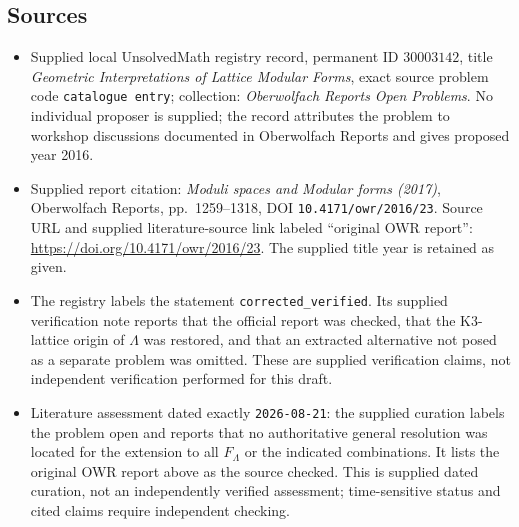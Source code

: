 \documentclass[11pt]{article}
\begin{document}
\subsection{Sources}
\begin{itemize}
\item Supplied local UnsolvedMath registry record, permanent ID \(30003142\), title \emph{Geometric Interpretations of Lattice Modular Forms}, exact source problem code \texttt{catalogue entry}; collection: \emph{Oberwolfach Reports Open Problems}. No individual proposer is supplied; the record attributes the problem to workshop discussions documented in Oberwolfach Reports and gives proposed year 2016.
\item Supplied report citation: \emph{Moduli spaces and Modular forms (2017)}, Oberwolfach Reports, pp.\ 1259--1318, DOI \texttt{10.4171/owr/2016/23}. Source URL and supplied literature-source link labeled ``original OWR report'': \url{https://doi.org/10.4171/owr/2016/23}. The supplied title year is retained as given.
\item The registry labels the statement \texttt{corrected\_verified}. Its supplied verification note reports that the official report was checked, that the K3-lattice origin of \(\Lambda\) was restored, and that an extracted alternative not posed as a separate problem was omitted. These are supplied verification claims, not independent verification performed for this draft.
\item Literature assessment dated exactly \texttt{2026-08-21}: the supplied curation labels the problem open and reports that no authoritative general resolution was located for the extension to all \(F_\Lambda\) or the indicated combinations. It lists the original OWR report above as the source checked. This is supplied dated curation, not an independently verified assessment; time-sensitive status and cited claims require independent checking.
\end{itemize}
\end{document}
